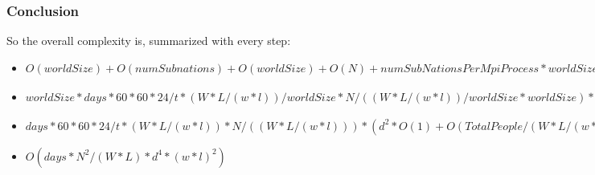 \documentclass[table, 12pt]{article}
\begin{document}
\subsubsection{Conclusion}
\begin{flushleft}
So the overall complexity is, summarized with every step:
\begin{itemize}
\setlength\itemsep{-0.5em}
\item $ O(worldSize) + O(numSubnations) +  O(worldSize) + O(N) + numSubNationsPerMpiProcess * worldSize * O(1) + worldSize * days * HowManyTimeStepsInADay *  numSubNationsPerMpiProcess * peopleInSubnation * (d^2 * O(1) + O(peopleInSubnation) + NumPeopleNearIndividual * O(1)) $

 
\item $ worldSize * days *  60 * 60 * 24 / t * (W*L/(w*l)) / worldSize * N/((W*L/(w*l)) / worldSize * worldSize) * (d^2 * O(1) + O(TotalPeople/((W*L/(w*l)) / worldSize * worldSize))+ d^4 / (N/((W*L/(w*l)) / worldSize * worldSize) * w*l) * O(1) ) $

\item $   days *  60 * 60 * 24 / t * (W*L/(w*l))  * N/((W*L/(w*l))) * (d^2 * O(1) + O(TotalPeople/(W*L/(w*l))) + d^4 / (TotalPeople/((W*L/(w*l))) * w*l) * O(1) ) $

\item $ O(days* N^2 /(W*L) * d^4 * (w * l)^2) $ 
\end{itemize}
\end{flushleft}
\end{document}

